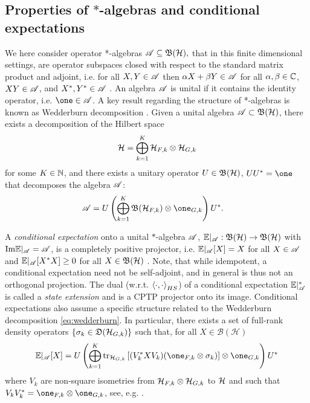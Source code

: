 \documentclass[aihp,12pt]{imsart}
\begin{document}
\subsection{Properties of $*$-algebras and conditional expectations}
We here consider operator *-algebras  $\mathscr{A}\subseteq\mathfrak{B}(\mathcal{H}),$ that in this finite dimensional settings, are operator subspaces closed with respect to the standard matrix product and adjoint, i.e. for all $X,Y\in\mathscr{A}$ then $\alpha X+\beta Y\in \mathscr{A}$ for all $\alpha,\beta\in\mathbb{C}$, $XY\in\mathscr{A}$, and $X^*, Y^* \in\mathscr{A}$ \cite{blackadar2006operator}. An algebra $\mathscr{A}$ is unital if it contains the identity operator, i.e. $\one \in\As$. A key result regarding the structure  of *-algebras is known as Wedderburn decomposition \cite{wedderburn1908hypercomplex}. 
Given a unital algebra $\mathscr{A}\subset\mathfrak{B}(\mathcal{H})$, there exists a decomposition of the Hilbert space
\[\mathcal{H} = \bigoplus_{k=1}^K \mathcal{H}_{F,k}\otimes\mathcal{H}_{G,k} \]
for some $K\in\mathbb{N}$, 
and there exists a unitary operator $U\in\mathfrak{B}(\mathcal{H})$, $U U^* = \one$ that decomposes the algebra $\mathscr{A}$:
\begin{align}
    \As &= U\left(\bigoplus_{k=1}^K \Bf(\Hc_{F,k}) \otimes \one_{G,k}\right)U^*\label{eq:wedderburn}.
\end{align}

A {\em conditional expectation} onto a unital $*$-algebra $\mathscr{A}$, $\mathbb{E}|_{\mathscr{A}}:\mathfrak{B}(\mathcal{H})\to\mathfrak{B}(\mathcal{H})$ with ${\rm Im}\mathbb{E}|_{\mathscr{A}} = \mathscr{A}$, is a completely positive projector, i.e. $\mathbb{E}|_{\mathscr{A}}[X] = X$ for all $X\in\mathscr{A}$ and $\mathbb{E}|_{\mathscr{A}}[X^* X]\geq 0$ for all $X\in\mathfrak{B}(\mathcal{H})$ \cite{blackadar2006operator}.
Note, that while idempotent, a conditional expectation need not be self-adjoint, and in general is thus not an orthogonal projection. The dual (w.r.t. $\left< \cdot,\cdot \right>_{HS}$) of a conditional expectation $\mathbb{E}|_{\mathscr{A}}^*$ is called a \textit{state extension} and is a CPTP projector onto its image. Conditional expectations also assume a specific structure related to the Wedderburn decomposition \eqref{eq:wedderburn}. In particular, there exists a set of full-rank density operators $\{\sigma_k\in\mathfrak{D}(\mathcal{H}_{G,k})\}$ such that, for all $X\in\mathcal{B(H)}$
    \begin{align}
         \CE_\mathscr{A}[X] 
         = U\left(\bigoplus_{k=1}^{K} \tr_{\Hc_{G,k}}\left[(V_k^* X V_k)(\one_{F,k}\otimes\sigma_k)\right]\otimes\one_{G,k}\right)U^*
        \label{eqn:cond_exp_blocks}
    \end{align}
where $V_k$ are non-square isometries from $\mathcal{H}_{F,k}\otimes\mathcal{H}_{G,k}$ to $\mathcal{H}$ and such that $V_k V_k^*=\one_{F,k}\otimes \one_{G,k}$, see, e.g. \cite{wolf2012quantum}.
\end{document}
